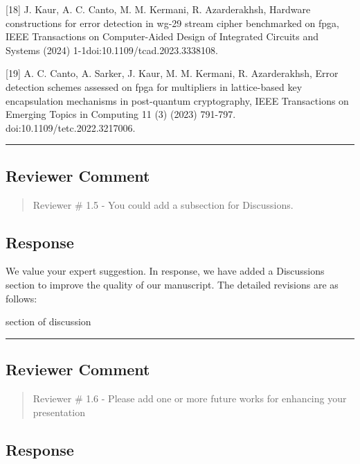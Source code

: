 [18] J. Kaur, A. C. Canto, M. M. Kermani, R. Azarderakhsh, Hardware constructions for error detection in wg-29 stream cipher benchmarked on fpga, IEEE Transactions on Computer-Aided Design of Integrated Circuits and Systems (2024) 1-1doi:10.1109/tcad.2023.3338108.

[19] A. C. Canto, A. Sarker, J. Kaur, M. M. Kermani, R. Azarderakhsh, Error detection schemes assessed on fpga for multipliers in lattice-based key encapsulation mechanisms in post-quantum cryptography, IEEE Transactions on Emerging Topics in Computing 11 (3) (2023) 791-797. doi:10.1109/tetc.2022.3217006.


\color{black}

\noindent\rule{\linewidth}{2.0pt}

\subsection{Reviewer Comment}
\begin{mdframed}
	\begin{quote}
		Reviewer \# 1.5 - You could add a subsection for Discussions.
	\end{quote}
\end{mdframed}

\subsection{Response}

We value your expert suggestion. In response, we have added a Discussions section to improve the quality of our manuscript. The detailed revisions are as follows:

\color{blue}
section of discussion

\color{black}

\noindent\rule{\linewidth}{2.0pt}

\subsection{Reviewer Comment}
\begin{mdframed}
	\begin{quote}
		Reviewer \# 1.6 - Please add one or more future works for enhancing your presentation
	\end{quote}
\end{mdframed}

\subsection{Response}

